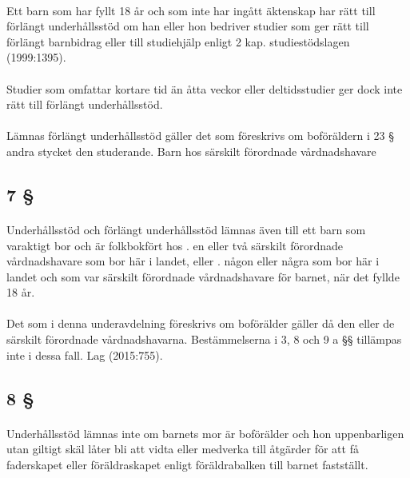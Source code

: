 \documentclass[a4paper,notitlepage,openany,10pt]{book}
\begin{document}
\paragraph*{}
Ett barn som har fyllt 18 år och som inte har ingått äktenskap har rätt till förlängt underhållsstöd om han eller hon bedriver studier som ger rätt till förlängt barnbidrag eller till studiehjälp enligt 2 kap. studiestödslagen (1999:1395).
\paragraph*{}
Studier som omfattar kortare tid än åtta veckor eller deltidsstudier ger dock inte rätt till förlängt underhållsstöd.
\paragraph*{}
Lämnas förlängt underhållsstöd gäller det som föreskrivs om boföräldern i 23 § andra stycket den studerande.
Barn hos särskilt förordnade vårdnadshavare
\subsection*{7 §}
\paragraph*{}
Underhållsstöd och förlängt underhållsstöd lämnas även till ett barn som varaktigt bor och är folkbokfört hos
. en eller två särskilt förordnade vårdnadshavare som bor här i landet, eller
. någon eller några som bor här i landet och som var särskilt förordnade vårdnadshavare för barnet, när det fyllde 18 år.
\paragraph*{}
Det som i denna underavdelning föreskrivs om boförälder gäller då den eller de särskilt förordnade vårdnadshavarna.
Bestämmelserna i 3, 8 och 9 a §§ tillämpas inte i dessa fall.
Lag (2015:755).
\subsection*{8 §}
\paragraph*{}
Underhållsstöd lämnas inte om barnets mor är boförälder och hon uppenbarligen utan giltigt skäl låter bli att vidta eller medverka till åtgärder för att få faderskapet eller föräldraskapet enligt föräldrabalken till barnet fastställt.
\end{document}
